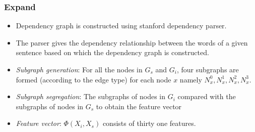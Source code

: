 \documentclass[11pt]{beamer}
\begin{document}
\begin{frame}
  \frametitle{Expand}
  \begin{overprint}[\linewidth]
  \end{overprint}
  \begin{overprint}[\linewidth]
    \begin{itemize}
    \item Dependency graph is constructed using stanford
      dependency parser.
    \item The parser gives the dependency relationship between
      the words of a given sentence based on which the dependency
      graph is constructed.
    \end{itemize}
    \begin{itemize}
    \item \emph{Subgraph generation}: For all the nodes in $G_s$ and
      $G_i$, four subgraphs are formed (according to the edge type)
      for each node $x$ namely $N^0_x, N^1_x, N^2_x, N^3_x$.
    \item \emph{Subgraph segregation}: The subgraphs of nodes in $G_i$
      compared with the subgraphs of nodes in $G_s$ to obtain the
      feature vector
    \item \emph{Feature vector}: $\Phi(X_i, X_s)$ consists of thirty
      one features.
    \end{itemize}
  \end{overprint}
\end{frame}
\end{document}
